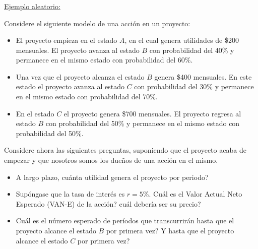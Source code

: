 \documentclass[ 10pt, xcolor = dvipsnames]{beamer}
\begin{document}
\begin{frame}[allowframebreaks]
\frametitle{\insertsubsection}

\underline{Ejemplo aleatorio:}

Considere el siguiente modelo de una acci\'on en un proyecto: 
\begin{itemize}
\item El proyecto empieza en el estado $A$, en el cual genera utilidades de \$200 mensuales. El proyecto avanza al estado $B$ con probabilidad del 40\% y permanece en el mismo estado con probabilidad del 60\%. 
\item Una vez que el proyecto alcanza el estado $B$ genera \$400 mensuales. En este estado el proyecto avanza al estado $C$ con probabilidad del 30\% y permanece en el mismo estado con probabilidad del 70\%. 
\item En el estado $C$ el proyecto genera \$700 mensuales. El proyecto regresa al estado $B$ con probabilidad del 50\% y permanece en el mismo estado con probabilidad del 50\%. 
\end{itemize}
\framebreak

\begin{figure}[htb]
\centering
\def\svgwidth{0.98\columnwidth}

\end{figure}
\framebreak

Considere ahora las siguientes preguntas, suponiendo que el proyecto acaba de empezar y que nosotros somos los due\~nos de una acci\'on en el mismo. 
\begin{itemize}
\item A largo plazo, cu\'anta utilidad genera el proyecto por periodo?
\item Sup\'ongase que la tasa de inter\'es es $r = 5\%$. Cu\'al es el Valor Actual Neto Esperado (VAN-E) de la acci\'on? \Ie cu\'al deber\'ia ser su precio? 
\item Cu\'al es el n\'umero esperado de per\'iodos que transcurrir\'an hasta que el proyecto alcance el estado $B$ por primera vez? Y hasta que el proyecto alcance el estado $C$ por primera vez? 
\end{itemize}

\end{frame}
\end{document}
